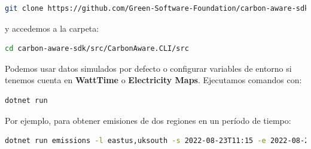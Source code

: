 \documentclass[12pt,a4paper]{report}
\begin{document}
\begin{tcolorbox}[colback=codebackground, colframe=codeborder, boxrule=0.8pt, arc=0mm, boxsep=5pt, left=5pt, right=5pt, top=5pt, bottom=5pt]
  \begin{lstlisting}[language=bash]
git clone https://github.com/Green-Software-Foundation/carbon-aware-sdk.git
\end{lstlisting}
\end{tcolorbox}

y accedemos a la carpeta:

\begin{tcolorbox}[colback=codebackground, colframe=codeborder, boxrule=0.8pt, arc=0mm, boxsep=5pt, left=5pt, right=5pt, top=5pt, bottom=5pt]
  \begin{lstlisting}[language=bash]
cd carbon-aware-sdk/src/CarbonAware.CLI/src
\end{lstlisting}
\end{tcolorbox}

Podemos usar datos simulados por defecto o configurar variables de entorno si
tenemos cuenta en \textbf{WattTime} o
\textbf{Electricity Maps}. Ejecutamos
comandos con:

\begin{tcolorbox}[colback=codebackground, colframe=codeborder, boxrule=0.8pt, arc=0mm, boxsep=5pt, left=5pt, right=5pt, top=5pt, bottom=5pt]
  \begin{lstlisting}[language=bash]
dotnet run
\end{lstlisting}
\end{tcolorbox}

Por ejemplo, para obtener emisiones de dos regiones en un período de tiempo:

\begin{tcolorbox}[colback=codebackground, colframe=codeborder, boxrule=0.8pt, arc=0mm, boxsep=5pt, left=5pt, right=5pt, top=5pt, bottom=5pt]
  \begin{lstlisting}[language=bash]
dotnet run emissions -l eastus,uksouth -s 2022-08-23T11:15 -e 2022-08-23T11:20
\end{lstlisting}
\end{tcolorbox}
\end{document}
